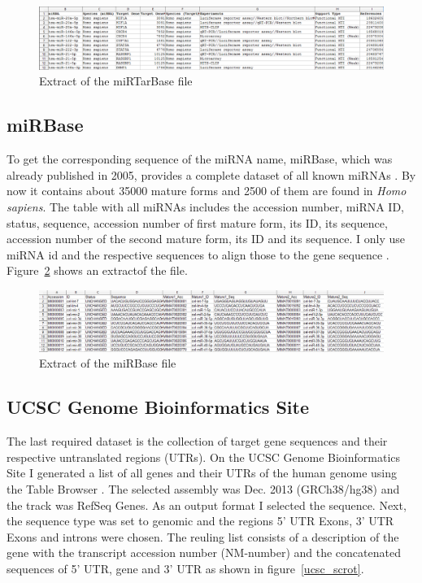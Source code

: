 \documentclass[12pt,  a4paper]{report}
\begin{document}
\begin{figure}[h]
\centering
\includegraphics[width=\textwidth]{results/mirtarbase_scrot.png}
\caption{Extract of the miRTarBase file}
\label{mirtarbase_scrot}
\end{figure}
\vspace{0.5cm}


\subsection{miRBase}
To get the corresponding sequence of the miRNA name, miRBase, which was already published in 2005, provides a complete dataset of all known miRNAs \cite{Griffiths-Jones}. By now it contains about 35000 mature forms and 2500 of them are found in \textit{Homo sapiens}. The table with all miRNAs includes the accession number, miRNA ID, status, sequence, accession number of first mature form, its ID, its sequence, accession number of the second mature form, its ID and its sequence. I only use miRNA id and the respective sequences to align those to the gene sequence \cite{mirbase}. Figure~\ref{mirbase_scrot} shows an extractof the file.\\


\begin{figure}[h]
\centering
\includegraphics[width=\textwidth]{results/mirbase.png}
\caption{Extract of the miRBase file}
\label{mirbase_scrot}
\end{figure}


\vspace{0.5cm}

 
\subsection{UCSC Genome Bioinformatics Site}
The last required dataset is the collection of target gene sequences and their respective untranslated regions (UTRs). On the UCSC Genome Bioinformatics Site I generated a list of all genes and their UTRs of the human genome using the Table Browser \cite{ucsc}. The selected assembly was Dec. 2013 (GRCh38/hg38) and the track was RefSeq Genes. As an output format I selected the sequence. Next, the sequence type was set to genomic and the regions 5' UTR Exons, 3' UTR Exons and introns were chosen. The reuling list consists of a description of the gene with the transcript accession number (NM-number) and the concatenated sequences of 5' UTR, gene and 3' UTR as shown in figure~\ref{ucsc_scrot}.\\
\end{document}
